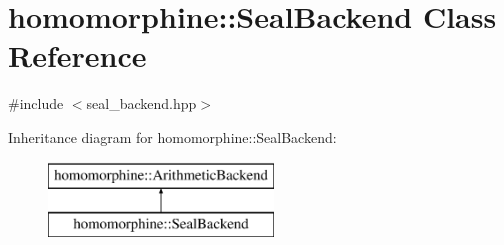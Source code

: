 \hypertarget{classhomomorphine_1_1_seal_backend}{}\section{homomorphine\+::Seal\+Backend Class Reference}
\label{classhomomorphine_1_1_seal_backend}


{\ttfamily \#include $<$seal\+\_\+backend.\+hpp$>$}

Inheritance diagram for homomorphine\+::Seal\+Backend\+:\begin{figure}[H]
\begin{center}
\leavevmode
\includegraphics[height=2.000000cm]{classhomomorphine_1_1_seal_backend}
\end{center}
\end{figure}
